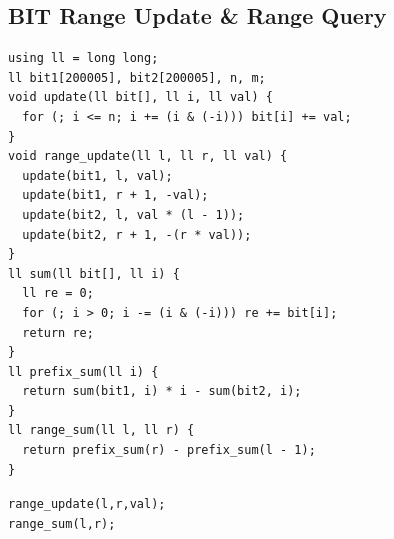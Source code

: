 \subsection{BIT Range Update \texorpdfstring{\&}{&} Range Query}
\begin{verbatim}
using ll = long long;
ll bit1[200005], bit2[200005], n, m;
void update(ll bit[], ll i, ll val) {
  for (; i <= n; i += (i & (-i))) bit[i] += val;
}
void range_update(ll l, ll r, ll val) {
  update(bit1, l, val);
  update(bit1, r + 1, -val);
  update(bit2, l, val * (l - 1));
  update(bit2, r + 1, -(r * val));
}
ll sum(ll bit[], ll i) {
  ll re = 0;
  for (; i > 0; i -= (i & (-i))) re += bit[i];
  return re;
}
ll prefix_sum(ll i) {
  return sum(bit1, i) * i - sum(bit2, i);
}
ll range_sum(ll l, ll r) {
  return prefix_sum(r) - prefix_sum(l - 1);
}
\end{verbatim}
\texttt{range\_update(l,r,val);}\\
\texttt{range\_sum(l,r);}
